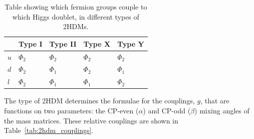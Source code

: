 \begin{table}[H]
    \centering
    \begin{tabular}{|x{1.0cm}|x{2.0cm}x{2.0cm}x{2.0cm}x{2.0cm}|}
    		\hline
    	 	& Type I & Type II & Type X & Type Y \\
    	 	\hline
    	 	\hline
    	 	$u$ & $\Phi_2$ & $\Phi_2$  & $\Phi_2$  & $\Phi_2$  \\ 
    	 	$d$ & $\Phi_2$ & $\Phi_1$ & $\Phi_2$ & $\Phi_1$ \\
    	 	$l$ & $\Phi_2$ & $\Phi_1$   & $\Phi_1$    & $\Phi_2$ \\
        \hline
    \end{tabular}
    \caption[The couplings of the Higgs doublets to fermion groups in the 2HDMs.]{Table showing which fermion groups couple to which Higgs doublet, in different types of 2HDMs.}
    \label{tab:2hdm_doublets}
\end{table}

The type of \ac{2HDM} determines the formulae for the couplings, $g$, that are functions on two parameters: the \ac{CP}-even ($\alpha$) and \ac{CP}-odd ($\beta$) mixing angles of the mass matrices.
These relative couplings are shown in Table~\ref{tab:2hdm_couplings}.

